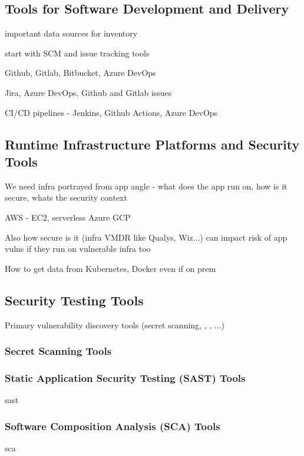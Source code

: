 \subsection{Tools for Software Development and Delivery}

important data sources for inventory

start with SCM and issue tracking tools

Github, Gitlab, Bitbucket, Azure DevOps

Jira, Azure DevOps, Github and Gitlab issues

CI/CD pipelines - Jenkins, Github Actions, Azure DevOps

\subsection{Runtime Infrastructure Platforms and Security Tools}

We need infra portrayed from app angle - what does the app run on, how is it secure, whats the security context

AWS - EC2, serverless
Azure
GCP

Also how secure is it (infra VMDR like Qualys, Wiz...) can impact risk of app vulns if they run on vulnerable infra too

How to get data from Kubernetes, Docker even if on prem

\subsection{Security Testing Tools}

Primary vulnerability discovery tools (secret scanning, , , ...)

\subsubsection{Secret Scanning Tools}

\subsubsection{Static Application Security Testing (SAST) Tools}

\gls{sast}

\subsubsection{Software Composition Analysis (SCA) Tools}

\gls{sca}

